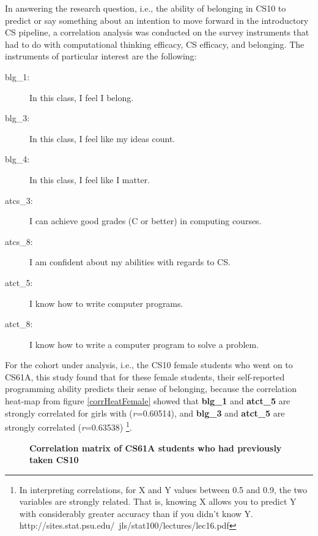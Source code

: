\documentclass[twoside,openright,titlepage,numbers=noenddot,headinclude,%
               footinclude=true,cleardoublepage=empty,abstractoff,BCOR=5mm,%
               paper=a4,fontsize=11pt,ngerman,american]{scrreprt}
\numberwithin{theorem}{chapter}
\numberwithin{definition}{chapter}
\numberwithin{algorithm}{chapter}
\numberwithin{figure}{chapter}
\numberwithin{table}{chapter}
\numberwithin{equation}{chapter}
\begin{document}
In answering the research question, i.e., the ability of belonging in CS10 to predict or say something about an intention to move forward in the introductory CS pipeline, a correlation analysis was conducted on the survey instruments that had to do with computational thinking efficacy, CS efficacy, and belonging. The instruments of particular interest are the following:
\begin{description} \item[blg\_1:] In this class, I feel I belong.
\item[blg\_3:] In this class, I feel like my ideas count.
\item[blg\_4:] In this class, I feel like I matter.
\item[atcs\_3:] I can achieve good grades (C or better) in computing courses.
\item[atcs\_8:] I am confident about my abilities with regards to CS.
\item[atct\_5:] I know how to write computer programs.
\item[atct\_8:] I know how to write a computer program to solve a problem.
\end{description}

For the cohort under analysis, i.e., the CS10 female students who went on to CS61A, this study found that for these female students, their self-reported programming ability predicts their sense of belonging, because the correlation heat-map from figure \ref{corrHeatFemale} showed that \textbf{blg\_1} and \textbf{atct\_5} are strongly correlated for girls with (\emph{r}=0.60514), and \textbf{blg\_3} and \textbf{atct\_5} are strongly correlated (\emph{r}=0.63538) \footnote{%
In interpreting correlations, for X and Y values between 0.5 and 0.9, the two variables are strongly related. That is, knowing X allows you to predict Y with considerably greater accuracy than if you didn't know Y. http://sites.stat.psu.edu/~jls/stat100/lectures/lec16.pdf
}. 

\begin{figure}[!htbp]
    \centering
\caption{\textbf{Correlation matrix of CS61A students who had previously taken CS10}}
\label{corrHeatMapFemaleCS10CS61A}
\end{figure}
\end{document}
